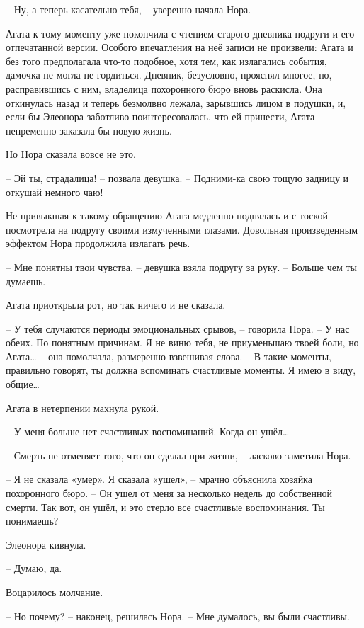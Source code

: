 \documentclass[
  a5paperpaper,
  DIV=11,
  numbers=noendperiod]{scrreprt}
\begin{document}

-- Ну, а теперь касательно тебя, -- уверенно начала Нора.

Агата к тому моменту уже покончила с чтением старого дневника подруги и
его отпечатанной версии. Особого впечатления на неё записи не произвели:
Агата и без того предполагала что-то подобное, хотя тем, как излагались
события, дамочка не могла не гордиться. Дневник, безусловно, прояснял
многое, но, расправившись с ним, владелица похоронного бюро вновь
раскисла. Она откинулась назад и теперь безмолвно лежала, зарывшись
лицом в подушки, и, если бы Элеонора заботливо поинтересовалась, что ей
принести, Агата непременно заказала бы новую жизнь.

Но Нора сказала вовсе не это.

-- Эй ты, страдалица! -- позвала девушка. -- Подними-ка свою тощую
задницу и откушай немного чаю!

Не привыкшая к такому обращению Агата медленно поднялась и с тоской
посмотрела на подругу своими измученными глазами. Довольная
произведенным эффектом Нора продолжила излагать речь.

-- Мне понятны твои чувства, -- девушка взяла подругу за руку. -- Больше
чем ты думаешь.

Агата приоткрыла рот, но так ничего и не сказала.

-- У тебя случаются периоды эмоциональных срывов, -- говорила Нора. -- У
нас обеих. По понятным причинам. Я не виню тебя, не приуменьшаю твоей
боли, но Агата\ldots{} -- она помолчала, размеренно взвешивая слова. --
В такие моменты, правильно говорят, ты должна вспоминать счастливые
моменты. Я имею в виду, общие\ldots{}

Агата в нетерпении махнула рукой.

-- У меня больше нет счастливых воспоминаний. Когда он ушёл\ldots{}

-- Смерть не отменяет того, что он сделал при жизни, -- ласково заметила
Нора.

-- Я не сказала «умер». Я сказала «ушел», -- мрачно объяснила хозяйка
похоронного бюро. -- Он ушел от меня за несколько недель до собственной
смерти. Так вот, он ушёл, и это стерло все счастливые воспоминания. Ты
понимаешь?

Элеонора кивнула.

-- Думаю, да.

Воцарилось молчание.

-- Но почему? -- наконец, решилась Нора. -- Мне думалось, вы были
счастливы.
\end{document}
